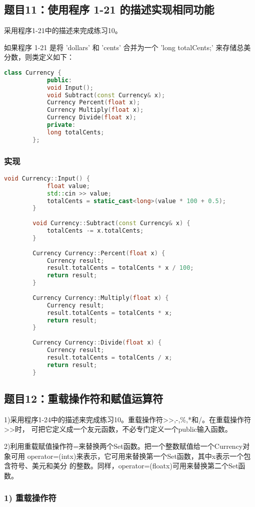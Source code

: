\documentclass[UTF8]{ctexart}
\begin{document}
	
	\subsection{题目11：使用程序 1-21 的描述实现相同功能}
	采用程序1-21中的描述来完成练习10。
	
	如果程序 1-21 是将 'dollars' 和 'cents' 合并为一个 'long totalCents;' 来存储总美分数，则类定义如下：
	
	\begin{lstlisting}[language=C++]
		class Currency {
			public:
			void Input();
			void Subtract(const Currency& x);
			Currency Percent(float x);
			Currency Multiply(float x);
			Currency Divide(float x);
			private:
			long totalCents;
		};
	\end{lstlisting}
	
	\subsubsection{实现}
	\begin{lstlisting}[language=C++]
		void Currency::Input() {
			float value;
			std::cin >> value;
			totalCents = static_cast<long>(value * 100 + 0.5);
		}
		
		void Currency::Subtract(const Currency& x) {
			totalCents -= x.totalCents;
		}
		
		Currency Currency::Percent(float x) {
			Currency result;
			result.totalCents = totalCents * x / 100;
			return result;
		}
		
		Currency Currency::Multiply(float x) {
			Currency result;
			result.totalCents = totalCents * x;
			return result;
		}
		
		Currency Currency::Divide(float x) {
			Currency result;
			result.totalCents = totalCents / x;
			return result;
		}
	\end{lstlisting}
	
	\subsection{题目12：重载操作符和赋值运算符}
	1)采用程序1-24中的描述来完成练习10。重载操作符>>,-,\%,*和/。在重载操作符>>时，
	可把它定义成一个友元函数，不必专门定义一个public输入函数。
	
	2)利用重载赋值操作符=来替换两个Set函数。把一个整数赋值给一个Currency对象可用
	operator=(intx)来表示，它可用来替换第一个Set函数，其中x表示一个包含符号、美元和美分
	的整数。同样，operator=(floatx)可用来替换第二个Set函数。
	
	\subsubsection{1) 重载操作符}
	
\end{document}
